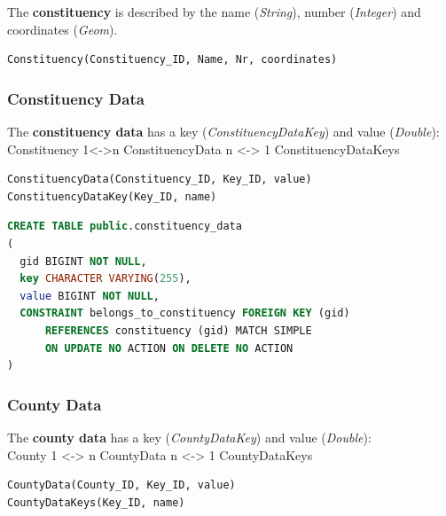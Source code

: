 The \textbf{constituency} is described by the name (\textit{String}), number
(\textit{Integer}) and coordinates (\textit{Geom}).


\begin{lstlisting}[caption=Constituency Relational Algebra,numbers=none]
Constituency(Constituency_ID, Name, Nr, coordinates)
\end{lstlisting}



\subsubsection{Constituency Data}\label{ImplementationConstituencyData}


The \textbf{constituency data} has a key (\textit{ConstituencyDataKey}) and
value (\textit{Double}):\\

Constituency 1\textless{}-\textgreater{}n
ConstituencyData n \textless{}-\textgreater{} 1 ConstituencyDataKeys


\begin{lstlisting}[caption=Constituency Data and -Keys Relational
Algebra,numbers=none]
ConstituencyData(Constituency_ID, Key_ID, value)
ConstituencyDataKey(Key_ID, name)
\end{lstlisting}



\begin{lstlisting}[caption=Constituency Data SQL,language=SQL]
CREATE TABLE public.constituency_data
(
  gid BIGINT NOT NULL,
  key CHARACTER VARYING(255),
  value BIGINT NOT NULL,
  CONSTRAINT belongs_to_constituency FOREIGN KEY (gid)
      REFERENCES constituency (gid) MATCH SIMPLE
      ON UPDATE NO ACTION ON DELETE NO ACTION
)
\end{lstlisting}



\subsubsection{County Data}\label{ImplementationCountyData}


The \textbf{county data} has a key (\textit{CountyDataKey}) and
value (\textit{Double}): \\

County 1 \textless{}-\textgreater{} n CountyData n \textless{}-\textgreater{}
1 CountyDataKeys


\begin{lstlisting}[caption=County Data and -Keys Relational
Algebra,numbers=none]
CountyData(County_ID, Key_ID, value)
CountyDataKeys(Key_ID, name)
\end{lstlisting}



